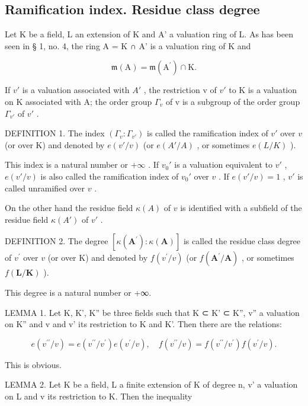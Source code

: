 \subsection{Ramification index. Residue class degree}

Let K be a field, L an extension of K and A' a valuation ring of L. As has been seen in § 1, no. 4, the ring A = K ∩ A' is a valuation ring of K and

\[
\mathfrak {m} (\mathrm{A}) = \mathfrak {m} (\mathrm{A} ^ {\prime}) \cap \mathrm{K}.
\]

If \(v'\) is a valuation associated with \(A'\) , the restriction v of \(v'\) to K is a valuation on K associated with A; the order group \(\Gamma_{v}\) of v is a subgroup of the order group \(\Gamma_{v'}\) of \(v'\) .

DEFINITION 1. The index \((\Gamma_v: \Gamma_{v'})\) is called the ramification index of \(v'\) over \(v\) (or over K) and denoted by \(e(v'/v)\) (or \(e(A'/A)\) , or sometimes \(e(L/K)\) ).

This index is a natural number or \(+\infty\) . If \(v_0'\) is a valuation equivalent to \(v'\) , \(e(v'/v)\) is also called the ramification index of \(v_0'\) over \(v\) . If \(e(v'/v) = 1\) , \(v'\) is called unramified over \(v\) .

On the other hand the residue field \(\kappa(A)\) of \(v\) is identified with a subfield of the residue field \(\kappa(A')\) of \(v'\) .

DEFINITION 2. The degree \([\kappa (\mathbf{A}^{\prime}):\kappa (\mathbf{A})]\) is called the residue class degree of \(v^{\prime}\) over \(v\) (or over K) and denoted by \(f(v^{\prime} / v)\) (or \(f(\mathbf{A}^{\prime} / \mathbf{A})\) , or sometimes \(f(\mathbf{L} / \mathbf{K})\) ).

This degree is a natural number or +∞.

LEMMA 1. Let K, K', K'' be three fields such that K ⊂ K' ⊂ K'', v'' a valuation on K'' and v and v' its restriction to K and K'. Then there are the relations:

\[
e (v ^ {\prime \prime} / v) = e (v ^ {\prime \prime} / v ^ {\prime}) e (v ^ {\prime} / v), \quad f (v ^ {\prime \prime} / v) = f (v ^ {\prime \prime} / v ^ {\prime}) f (v ^ {\prime} / v).\tag{1}
\]

This is obvious.

LEMMA 2. Let K be a field, L a finite extension of K of degree n, v' a valuation on L and v its restriction to K. Then the inequality

